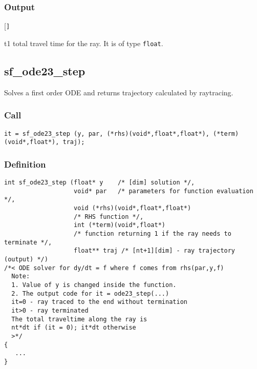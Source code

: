 \subsubsection*{Output}
\begin{desclist}{\tt }{\quad}[\tt ]
   \setlength\itemsep{0pt}
   \item[t1] total travel time for the ray. It is of type \texttt{float}.
\end{desclist}




\subsection{{sf\_ode23\_step}}
Solves a first order ODE and returns trajectory calculated by raytracing.

\subsubsection*{Call}
\begin{verbatim}
it = sf_ode23_step (y, par, (*rhs)(void*,float*,float*), (*term)(void*,float*), traj);
\end{verbatim}

\subsubsection*{Definition}
\begin{verbatim}
int sf_ode23_step (float* y    /* [dim] solution */, 
                   void* par   /* parameters for function evaluation */,
                   void (*rhs)(void*,float*,float*) 
                   /* RHS function */, 
                   int (*term)(void*,float*)
                   /* function returning 1 if the ray needs to terminate */, 
                   float** traj /* [nt+1][dim] - ray trajectory (output) */) 
/*< ODE solver for dy/dt = f where f comes from rhs(par,y,f)
  Note:
  1. Value of y is changed inside the function.
  2. The output code for it = ode23_step(...)
  it=0 - ray traced to the end without termination
  it>0 - ray terminated
  The total traveltime along the ray is 
  nt*dt if (it = 0); it*dt otherwise 
  >*/
{
   ...  
}
\end{verbatim}

